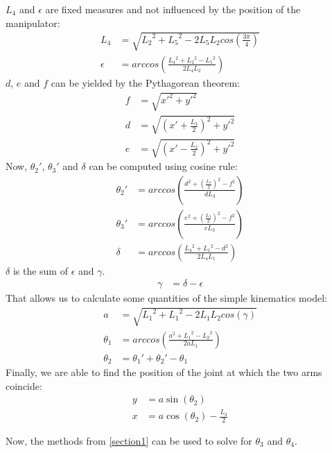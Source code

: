 \documentclass{sig-alternate-05-2015}
\begin{document}
$L_4$ and $\epsilon$ are fixed measures and not influenced by the position of the manipulator:
\begin{align*}
L_4 &= \sqrt{{L_2}^2 + {L_5}^2 - 2L_5L_2cos\left(\frac{3\pi}{4}\right)}\\
\epsilon &= arccos\left(  \frac{{L_4}^2 + {L_2}^2 - {L_5}^2}{2L_4L_2} \right)\end{align*}
$d$, $e$ and $f$ can be yielded by the Pythagorean theorem:
\begin{align*}
f &= \sqrt{{x'}^2 + {y'}^2}\\
d &= \sqrt{\left(x'+ \frac{L_3}{2}\right)^2 + {y'}^2}\\
e &= \sqrt{\left(x'- \frac{L_3}{2}\right)^2 + {y'}^2}
\end{align*}
Now, $\theta_2'$, $\theta_3'$ and $\delta$ can be computed using cosine rule:
\begin{align*}
\theta_2' &= arccos\left(  \frac{d^2 + (\frac{L_3}{2})^2 - f^2}{dL_3} \right)\\
\theta_3' &= arccos\left(  \frac{e^2 + (\frac{L_3}{2})^2 - f^2}{eL_3} \right)\\
\delta    &= arccos\left(  \frac{{L_4}^2 + {L_1}^2 - d^2}{2L_4L_1} \right)
\end{align*}
$\delta$ is the sum of $\epsilon$ and $\gamma$.
\begin{align*}
\gamma &= \delta - \epsilon
\end{align*}
That allows us to calculate some quantities of the simple kinematics model:
\begin{align*}
a 		 &= \sqrt{{L_1}^2 + {L_1}^2 - 2L_1L_2cos\left(\gamma\right)}\\
\theta_1 &= arccos\left(  \frac{a^2 + {L_1}^2 - {L_2}^2}{2aL_1} \right)\\
\theta_2 &= \theta_1' + \theta_2' - \theta_1
\end{align*}
Finally, we are able to find the position of the joint at which the two arms coincide:
\begin{align*}
y &= a \sin(\theta_2)\\
x &= a\cos(\theta_2) - \frac{L_3}{2}
\end{align*}

Now, the methods from \autoref{section1} can be used to solve for $\theta_3$ and $\theta_4$.
\end{document}
